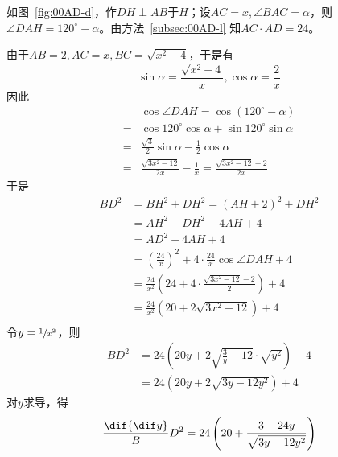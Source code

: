 如图~\ref{fig:00AD-d}，作$DH \perp AB$于$H$；设$AC = x, \angle BAC = \alpha$，则$\angle DAH = 120^\circ - \alpha$。由方法~\ref{subsec:00AD-l} 知$AC\cdot AD = 24$。

由于$AB = 2, AC = x, BC = \sqrt{x^2 - 4}$，于是有
\[ \sin\alpha = \frac{\sqrt{x^2 - 4}}x, \cos\alpha = \frac2x \]
因此
\begin{align*}
  & \cos\angle DAH = \cos(120^\circ - \alpha) \\
  ={}& \cos120^\circ\cos\alpha + \sin120^\circ\sin\alpha \\
  ={}& \frac{\sqrt3}2\sin\alpha - \frac12\cos\alpha \\
  ={}& \frac{\sqrt{3x^2 - 12}}{2x} - \frac1x = \frac{\sqrt{3x^2 - 12} - 2}{2x}
\end{align*}
于是
\begin{align*}
  BD^2 &= BH^2 + DH^2 = (AH + 2)^2 + DH^2 \\
  &= AH^2 + DH^2 + 4AH + 4 \\
  &= AD^2 + 4AH + 4 \\
  &= \left(\frac{24}x\right)^2 + 4\cdot\frac{24}x\cos\angle DAH + 4 \\
  &= \frac{24}{x^2}\left(24 + 4\cdot\frac{\sqrt{3x^2 - 12} - 2}2\right) + 4 \\
  &= \frac{24}{x^2}\left(20 + 2\sqrt{3x^2 - 12}\right) + 4 \\
\end{align*}
令$y = \sfrac1{x^2}$，则
\begin{align*}
  BD^2 &= 24\left(20y + 2\sqrt{\frac3y - 12}\cdot\sqrt{y^2}\right) + 4 \\
  &= 24\left(20y + 2\sqrt{3y - 12y^2}\right) + 4
\end{align*}
对$y$求导，得
\[ \frac\dif{\dif y}BD^2 = 24\left(20 + \frac{3 - 24y}{\sqrt{3y - 12y^2}}\right) \]

